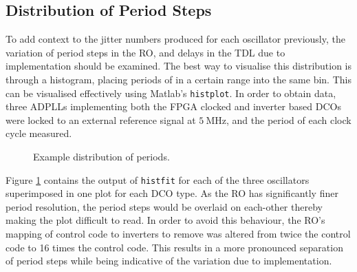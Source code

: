 \subsection{Distribution of Period Steps}
To add context to the jitter numbers produced for each oscillator previously, the variation of period steps in the \ac{RO}, and delays in the \ac{TDL} due to implementation should be examined. The best way to visualise this distribution is through a histogram, placing periods of in a certain range into the same bin. This can be visualised effectively using Matlab's \texttt{histplot}. In order to obtain data, three \ac{ADPLL}s implementing both the \ac{FPGA} clocked and inverter based \ac{DCO}s were locked to an external reference signal at $5~\si{\mega\hertz}$, and the period of each clock cycle measured.
\begin{figure}[h]%
    \centering
    \caption[Example distribution of periods]{Example distribution of periods.}    
    \label{fig:dists}
\end{figure}
Figure \ref{fig:dists} contains the output of \texttt{histfit} for each of the three oscillators superimposed in one plot for each \ac{DCO} type. As the \ac{RO} has significantly finer period resolution, the period steps would be overlaid on each-other thereby making the plot difficult to read. In order to avoid this behaviour, the \ac{RO}'s mapping of control code to inverters to remove was altered from twice the control code to 16 times the control code. This results in a more pronounced separation of period steps while being indicative of the variation due to implementation.
